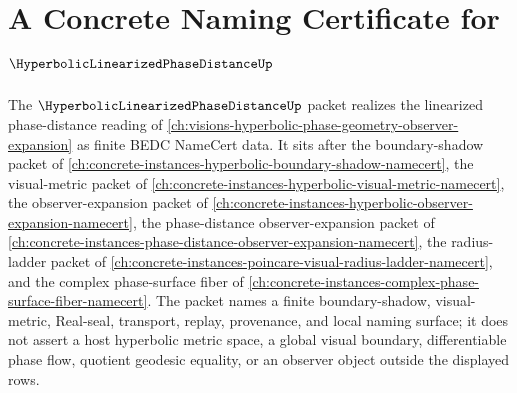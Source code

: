 \chapter{A Concrete Naming Certificate for $\HyperbolicLinearizedPhaseDistanceUp$}
\label{ch:concrete-instances-hyperbolic-linearized-phase-distance-namecert}

The $\HyperbolicLinearizedPhaseDistanceUp$ packet realizes the linearized phase-distance reading of \autoref{ch:visions-hyperbolic-phase-geometry-observer-expansion} as finite BEDC NameCert data. It sits after the boundary-shadow packet of \autoref{ch:concrete-instances-hyperbolic-boundary-shadow-namecert}, the visual-metric packet of \autoref{ch:concrete-instances-hyperbolic-visual-metric-namecert}, the observer-expansion packet of \autoref{ch:concrete-instances-hyperbolic-observer-expansion-namecert}, the phase-distance observer-expansion packet of \autoref{ch:concrete-instances-phase-distance-observer-expansion-namecert}, the radius-ladder packet of \autoref{ch:concrete-instances-poincare-visual-radius-ladder-namecert}, and the complex phase-surface fiber of \autoref{ch:concrete-instances-complex-phase-surface-fiber-namecert}. The packet names a finite boundary-shadow, visual-metric, Real-seal, transport, replay, provenance, and local naming surface; it does not assert a host hyperbolic metric space, a global visual boundary, differentiable phase flow, quotient geodesic equality, or an observer object outside the displayed rows.

